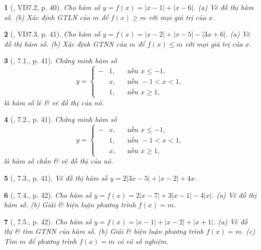 \documentclass{article}
\newtheorem{baitoan}{}
\begin{document}
\begin{baitoan}[\cite{TLCT_THCS_Toan_9_dai_so}, VD7.2, p. 40]
	Cho hàm số $y = f(x) = |x - 1| + |x - 6|$. (a) Vẽ đồ thị hàm số. (b) Xác định {\rm GTLN} của $m$ để $f(x)\ge m$ với mọi giá trị của $x$.
\end{baitoan}

\begin{baitoan}[\cite{TLCT_THCS_Toan_9_dai_so}, VD7.3, p. 41]
	Cho hàm số $y = f(x) = |x - 2| + |x - 5| - |3x + 6|$. (a) Vẽ đồ thị hàm số. (b) Xác định {\rm GTNN} của $m$ để $f(x)\le m$ với mọi giá trị của $x$.
\end{baitoan}

\begin{baitoan}[\cite{TLCT_THCS_Toan_9_dai_so}, 7.1., p. 41]
	Chứng minh hàm số
	\begin{equation*}
		y = \left\{\begin{split}
			-&1,&&\mbox{nếu } x\le-1,\\
			&x,&&\mbox{nếu } -1 < x < 1,\\
			&1,&&\mbox{nếu } x\ge 1,
		\end{split}\right.
	\end{equation*}
	là hàm số lẻ \& vẽ đồ thị của nó.
\end{baitoan}

\begin{baitoan}[\cite{TLCT_THCS_Toan_9_dai_so}, 7.2., p. 41]
	Chứng minh hàm số
	\begin{equation*}
		y = \left\{\begin{split}
			-&x,&&\mbox{nếu } x\le-1,\\
			&1,&&\mbox{nếu } -1 < x < 1,\\
			&x,&&\mbox{nếu } x\ge 1,
		\end{split}\right.
	\end{equation*}
	là hàm số chẵn \& vẽ đồ thị của nó.
\end{baitoan}

\begin{baitoan}[\cite{TLCT_THCS_Toan_9_dai_so}, 7.3., p. 41]
	Vẽ đồ thị hàm số $y = 2|3x - 5| + |x - 2| + 4x$.
\end{baitoan}

\begin{baitoan}[\cite{TLCT_THCS_Toan_9_dai_so}, 7.4., p. 42]
	Cho hàm số $y = f(x) = 2|x - 7| + 3|x - 1| - 4|x|$. (a) Vẽ đồ thị hàm số. (b) Giải \& biện luận phương trình $f(x) = m$. 
\end{baitoan}

\begin{baitoan}[\cite{TLCT_THCS_Toan_9_dai_so}, 7.5., p. 42]
	Cho hàm số $y = f(x) = |x - 1| + |x - 2| + |x + 1|$. (a) Vẽ đồ thị \& tìm {\rm GTNN} của hàm số. (b) Giải \& biện luận phương trình $f(x) = m$. (c) Tìm $m$ để phương trình $f(x) = m$ có vô số nghiệm.
\end{baitoan}
\end{document}
